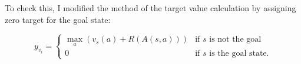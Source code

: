 To check this, I modified the method of the target value calculation by assigning zero target for the goal state:

\begin{equation*}
y_{v_i} = \begin{cases}
\max_a(v_s(a) + R(A(s, a)))& \text{if $s$ is not the goal}\\
0& \text{if $s$ is the goal state.}
\end{cases}
\end{equation*}


